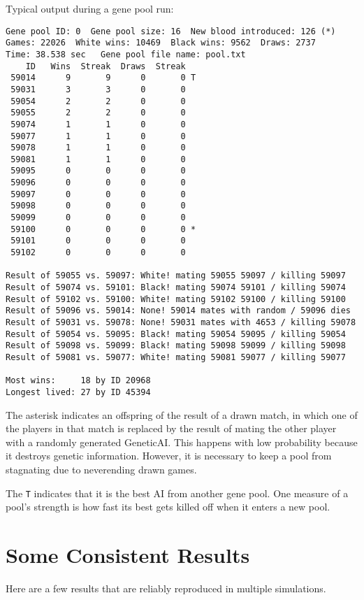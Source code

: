 \documentclass[letter]{article}
\renewcommand\_{\textunderscore\allowbreak}
\begin{document}
Typical output during a gene pool run:
\begin{verbatim}
Gene pool ID: 0  Gene pool size: 16  New blood introduced: 126 (*)
Games: 22026  White wins: 10469  Black wins: 9562  Draws: 2737
Time: 38.538 sec   Gene pool file name: pool.txt
    ID   Wins  Streak  Draws  Streak
 59014      9       9      0       0 T
 59031      3       3      0       0
 59054      2       2      0       0
 59055      2       2      0       0
 59074      1       1      0       0
 59077      1       1      0       0
 59078      1       1      0       0
 59081      1       1      0       0
 59095      0       0      0       0
 59096      0       0      0       0
 59097      0       0      0       0
 59098      0       0      0       0
 59099      0       0      0       0
 59100      0       0      0       0 *
 59101      0       0      0       0
 59102      0       0      0       0

Result of 59055 vs. 59097: White! mating 59055 59097 / killing 59097
Result of 59074 vs. 59101: Black! mating 59074 59101 / killing 59074
Result of 59102 vs. 59100: White! mating 59102 59100 / killing 59100
Result of 59096 vs. 59014: None! 59014 mates with random / 59096 dies
Result of 59031 vs. 59078: None! 59031 mates with 4653 / killing 59078
Result of 59054 vs. 59095: Black! mating 59054 59095 / killing 59054
Result of 59098 vs. 59099: Black! mating 59098 59099 / killing 59098
Result of 59081 vs. 59077: White! mating 59081 59077 / killing 59077

Most wins:     18 by ID 20968
Longest lived: 27 by ID 45394

\end{verbatim}
The asterisk indicates an offspring of the result of a drawn match, in which one of the players in that match is replaced by the result of mating the other player with a randomly generated Genetic\_AI. This happens with low probability because it destroys genetic information. However, it is necessary to keep a pool from stagnating due to neverending drawn games.

The \verb|T| indicates that it is the best AI from another gene pool. One measure of a pool's strength is how fast its best gets killed off when it enters a new pool.


\section{Some Consistent Results}

Here are a few results that are reliably reproduced in multiple simulations.
\end{document}
